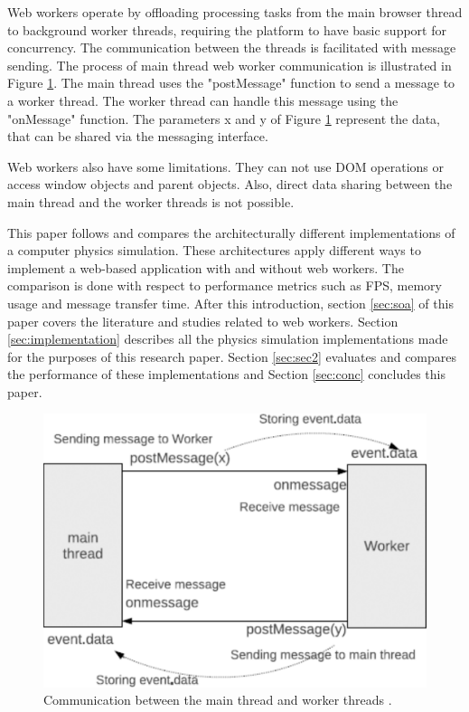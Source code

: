 \documentclass[conference]{IEEEtran}
\begin{document}
Web workers operate by offloading processing tasks from the main browser thread to background worker threads, requiring the platform to have basic support for concurrency. 
The communication between the threads is facilitated with message sending. The process of main thread web worker communication is illustrated in Figure \ref{fig:figure1}. 
The main thread uses the "postMessage" function to send a message to a worker thread. The worker thread can handle this message using the "onMessage" function. The parameters x and y of Figure \ref{fig:figure1} represent the data, that can be shared via the messaging interface. \cite{doha, watanabe}

Web workers also have some limitations. They can not use DOM operations or access window objects and parent objects. Also, direct data sharing between the main thread and the worker threads is not possible. \cite{watanabe}

This paper follows and compares the architecturally different implementations of a computer physics simulation. These architectures apply different ways to implement a 
web-based application with and without web workers. The comparison is done with respect to performance metrics such as FPS, memory usage and message transfer time. After this introduction, section \ref{sec:soa} of this paper covers the literature and studies related to web workers. Section \ref{sec:implementation} describes all the
physics simulation implementations made for the purposes of this research paper. Section \ref{sec:sec2} evaluates and compares the performance of these implementations and
Section \ref{sec:conc} concludes this paper.

\begin{figure}[ht]
	\centering
	\includegraphics[scale=0.25]{figs/figure1.png}
	\caption{Communication between the main thread and worker threads \cite{watanabe}.}
	\label{fig:figure1}
\end{figure}
\end{document}
